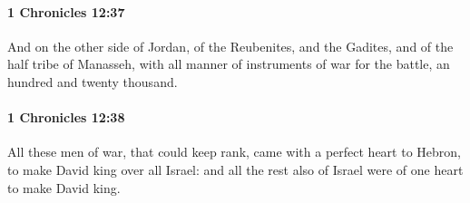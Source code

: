 		\paragraph{1 Chronicles 12:37} %
			\label{1CHRONICLES-12-37}

			And on the other side of Jordan, of the Reubenites, and the Gadites, and of the half tribe of Manasseh, with all manner of instruments of war for the battle, an hundred and twenty thousand.


		\paragraph{1 Chronicles 12:38} %
			\label{1CHRONICLES-12-38}

			All these men of war, that could keep rank, came with a perfect heart to Hebron, to make David king over all Israel: and all the rest also of Israel were of one heart to make David king.

